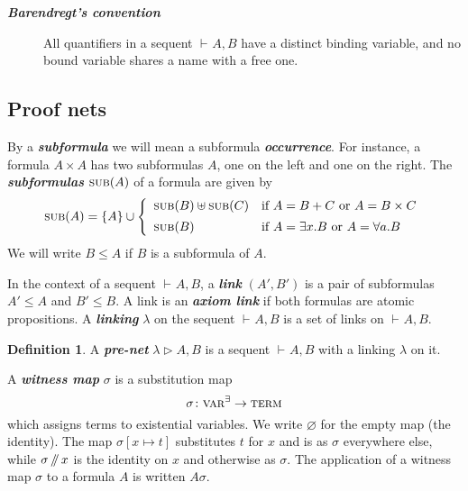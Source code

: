 \documentclass{article}
\theoremstyle{definition}
\newtheorem{definition}{Definition}
\theoremstyle{plain}
\newcommand\defn[1]{\textit{\textbf{#1}}}
\newcommand\varE{\textsc{var}^\exists}
\newcommand\terms{\textsc{term}}
\newcommand\termsA{\textsc{term}^\forall}
\newcommand\subs[1]{\textsc{sub}(#1)}
\newcommand\+{+}
\renewcommand\*{\times}
\newcommand\sub{\leq}
\newcommand\seq[3][]{{\vdash_{#1}}#2,#3}
\newcommand\net[3]{#1\triangleright #2,#3}
\newcommand\minus{\mathop{/\mathchoice{\kern-3pt}{\kern-3pt}{\kern-2.5pt}{\kern-2pt}/}}
\begin{document}
\begin{description}
	\item
[\defn{Barendregt's convention}] All quantifiers in a sequent $\seq AB$ have a distinct binding variable, and no bound variable shares a name with a free one.
\end{description}


\subsection{Proof nets}

By a \defn{subformula} we will mean a subformula \defn{occurrence}. For instance, a formula $A\*A$ has two subformulas $A$, one on the left and one on the right. The \defn{subformulas} $\subs A$ of a formula are given by
\[
	\subs A = \{A\} \cup
	\left\{\begin{array}{ll}
		\subs B\uplus\subs C	& \text{if $A=B\+C$ or $A=B\*C$} \\[5pt]
		\subs B					& \text{if $A=\exists x.B$ or $A=\forall a.B$}
	\end{array}\right.
\]
We will write $B\sub A$ if $B$ is a subformula of $A$. 


In the context of a sequent $\seq AB$, a \defn{link} $(A',B')$ is a pair of subformulas $A'\leq A$ and $B'\leq B$. A link is an \defn{axiom link} if both formulas are atomic propositions. A \defn{linking} $\lambda$ on the sequent $\seq AB$ is a set of links on $\seq AB$. %

\begin{definition}
A \defn{pre-net} $\net\lambda AB$ is a sequent $\seq AB$ with a linking $\lambda$ on it.
\end{definition}

A \defn{witness map} $\sigma$ is a substitution map
\[
	\sigma\colon \varE \to \terms
\]
which assigns terms to existential variables. We write $\varnothing$ for the empty map (the identity). The map $\sigma[x\mapsto t]$ substitutes $t$ for $x$ and is as $\sigma$ everywhere else, while $\sigma\minus x$ is the identity on $x$ and otherwise as $\sigma$. The application of a witness map $\sigma$ to a formula $A$ is written $A\sigma$. 
\end{document}
